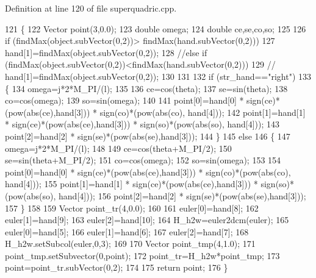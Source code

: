 Definition at line 120 of file superquadric.\+cpp.


\begin{DoxyCode}
121 \{
122     Vector point(3,0.0);
123     \textcolor{keywordtype}{double} omega;
124     \textcolor{keywordtype}{double} ce,se,co,so;
125 
126     \textcolor{keywordflow}{if} (findMax(\textcolor{keywordtype}{object}.subVector(0,2))> findMax(hand.subVector(0,2)))
127         hand[1]=findMax(\textcolor{keywordtype}{object}.subVector(0,2));
128     \textcolor{comment}{//else if (findMax(object.subVector(0,2))<findMax(hand.subVector(0,2)))}
129     \textcolor{comment}{//    hand[1]=findMax(object.subVector(0,2));  }
130 
131 
132     \textcolor{keywordflow}{if} (str\_hand==\textcolor{stringliteral}{"right"})
133     \{
134         omega=j*2*M\_PI/(l);
135 
136         ce=cos(theta);
137         se=sin(theta);
138         co=cos(omega);
139         so=sin(omega);
140 
141         point[0]=hand[0] * sign(ce)*(pow(abs(ce),hand[3])) * sign(co)*(pow(abs(co),
      hand[4]));
142         point[1]=hand[1] * sign(ce)*(pow(abs(ce),hand[3])) * sign(so)*(pow(abs(so),
      hand[4]));
143         point[2]=hand[2] * sign(se)*(pow(abs(se),hand[3]));
144     \}
145     \textcolor{keywordflow}{else}
146     \{
147         omega=j*2*M\_PI/(l);
148 
149         ce=cos(theta+M\_PI/2);
150         se=sin(theta+M\_PI/2);
151         co=cos(omega);
152         so=sin(omega);
153 
154         point[0]=hand[0] * sign(ce)*(pow(abs(ce),hand[3])) * sign(co)*(pow(abs(co),
      hand[4]));
155         point[1]=hand[1] * sign(ce)*(pow(abs(ce),hand[3])) * sign(so)*(pow(abs(so),
      hand[4]));
156         point[2]=hand[2] * sign(se)*(pow(abs(se),hand[3]));
157     \}
158 
159     Vector point\_tr(4,0.0);
160 
161     euler[0]=hand[8];
162     euler[1]=hand[9];
163     euler[2]=hand[10];
164     H\_h2w=euler2dcm(euler);
165     euler[0]=hand[5];
166     euler[1]=hand[6];
167     euler[2]=hand[7];
168     H\_h2w.setSubcol(euler,0,3);
169 
170     Vector point\_tmp(4,1.0);
171     point\_tmp.setSubvector(0,point);
172     point\_tr=H\_h2w*point\_tmp;
173     point=point\_tr.subVector(0,2);
174 
175     \textcolor{keywordflow}{return} point;
176 \}
\end{DoxyCode}
